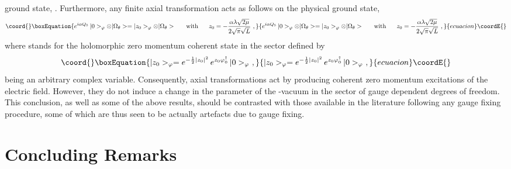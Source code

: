 \documentclass[a4paper,11pt]{article}
\begin{document}
ground state, \coordHE{}. Furthermore, any finite axial transformation acts as 
follows on the physical ground state,
\begin{equation}\coord{}\boxEquation{
e^{i\alpha Q_5}\,|0>_\varphi\otimes|\Omega_\theta>=
|z_0>_\varphi\otimes|\Omega_\theta>\ \ \ \ \ 
{\rm with}\ \ \ \ \ z_0=-\frac{\alpha\lambda\sqrt{2\mu}}{2\sqrt{\pi}\sqrt{L}}\ ,
}{
e^{i\alpha Q_5}\,|0>_\varphi\otimes|\Omega_\theta>=
|z_0>_\varphi\otimes|\Omega_\theta>\ \ \ \ \ 
{\rm with}\ \ \ \ \ z_0=-\frac{\alpha\lambda\sqrt{2\mu}}{2\sqrt{\pi}\sqrt{L}}\ ,
}{ecuacion}\coordE{}\end{equation}
where \myHighlight{$|z_0>_\varphi$}\coordHE{} stands for the holomorphic zero momentum
coherent state in the \coordHE{} sector defined by
\begin{equation}\coord{}\boxEquation{
|z_0>_\varphi=e^{-\frac{1}{2}|z_0|^2}\,e^{z_0\varphi^\dagger_0}\,|0>_\varphi\ ,
}{
|z_0>_\varphi=e^{-\frac{1}{2}|z_0|^2}\,e^{z_0\varphi^\dagger_0}\,|0>_\varphi\ ,
}{ecuacion}\coordE{}\end{equation}
\myHighlight{$z_0$}\coordHE{} being an arbitrary complex variable.
Consequently, axial transformations act by producing coherent
zero momentum excitations of the electric field. However, they do not induce
a change in the \myHighlight{$\theta$}\coordHE{} parameter of the \myHighlight{$\theta$}\coordHE{}-vacuum \myHighlight{$|\Omega_\theta>$}\coordHE{}
in the sector of gauge dependent degrees of freedom.
This conclusion, as well as some of the above results, should be
contrasted with those available in the literature following any
gauge fixing procedure,\cite{SchM1,Manton,Hetrick} some of which are thus 
seen to be actually artefacts due to gauge fixing.

\section{Concluding Remarks}
\label{Sect6}
\end{document}
